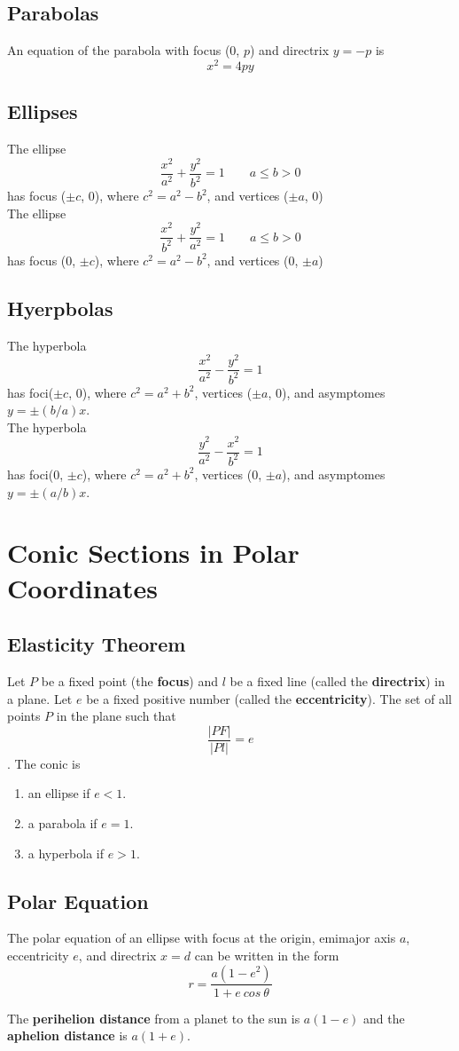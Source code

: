 \subsection*{Parabolas}
An equation of the parabola with focus (0, $p$) and directrix $y=-p$ is
$$ x^2=4py $$

\subsection*{Ellipses}
The ellipse
$$ \frac{x^2}{a^2}+\frac{y^2}{b^2}=1 \qquad a \leq b > 0 $$
has focus ($\pm c$, 0), where $c^2=a^2-b^2$, and vertices ($\pm a$, 0) \\
The ellipse
$$ \frac{x^2}{b^2}+\frac{y^2}{a^2}=1 \qquad a \leq b > 0 $$
has focus (0, $\pm c$), where $c^2=a^2-b^2$, and vertices (0, $\pm a$)

\subsection*{Hyerpbolas}
The hyperbola
$$ \frac{x^2}{a^2}-\frac{y^2}{b^2}=1 $$
has foci($\pm c$, 0), where $c^2=a^2+b^2$, vertices ($\pm a$, 0), and
asymptomes $y=\pm(b/a)x$. \\
The hyperbola
$$ \frac{y^2}{a^2}-\frac{x^2}{b^2}=1 $$
has foci(0, $\pm c$), where $c^2=a^2+b^2$, vertices (0, $\pm a$), and
asymptomes $y=\pm(a/b)x$.

\section{Conic Sections in Polar Coordinates}
\subsection{Elasticity Theorem}
Let $P$ be a fixed point (the \textbf{focus}) and $l$ be a fixed line (called the \textbf{directrix})
in a plane. Let $e$ be a fixed positive number (called the \textbf{eccentricity}).
The set of all points $P$ in the plane such that
$$ \frac{|PF|}{|Pl|}=e $$. The conic is 
\begin{enumerate}
    \item an ellipse if $e < 1$.
    \item a parabola if $e = 1$.
    \item a hyperbola if $e > 1$.
\end{enumerate}

\subsection{Polar Equation}
The polar equation of an ellipse with focus at the origin, emimajor axis $a$,
eccentricity $e$, and directrix $x=d$ can be written in the form
$$ r=\frac{a(1-e^2)}{1+e\:cos\:\theta} $$

The \textbf{perihelion distance} from a planet to the sun is $a(1-e)$
and the \textbf{aphelion distance} is $a(1+e)$.


